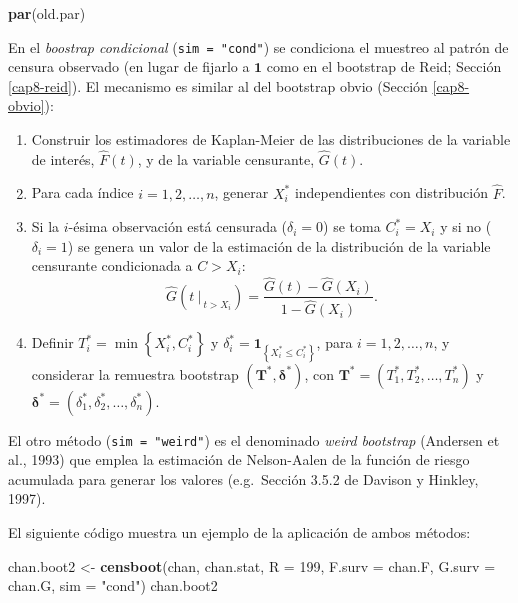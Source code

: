 \documentclass[
]{book}
\newenvironment{Shaded}{\begin{snugshade}}{\end{snugshade}}
\newcommand{\DataTypeTok}[1]{\textcolor[rgb]{0.13,0.29,0.53}{#1}}
\newcommand{\DecValTok}[1]{\textcolor[rgb]{0.00,0.00,0.81}{#1}}
\newcommand{\KeywordTok}[1]{\textcolor[rgb]{0.13,0.29,0.53}{\textbf{#1}}}
\newcommand{\NormalTok}[1]{#1}
\newcommand{\StringTok}[1]{\textcolor[rgb]{0.31,0.60,0.02}{#1}}
\theoremstyle{definition}
\theoremstyle{definition}
\theoremstyle{definition}
\theoremstyle{remark}
\begin{document}
\begin{Shaded}
\begin{Highlighting}[]
\KeywordTok{par}\NormalTok{(old.par)}
\end{Highlighting}
\end{Shaded}

En el \emph{boostrap condicional} (\texttt{sim\ =\ "cond"}) se condiciona el muestreo al
patrón de censura observado (en lugar de fijarlo a \(\mathbf{1}\) como en el bootstrap de Reid; Sección \ref{cap8-reid}).
El mecanismo es similar al del bootstrap obvio (Sección \ref{cap8-obvio}):

\begin{enumerate}
\def\labelenumi{\arabic{enumi}.}
\item
  Construir los estimadores de Kaplan-Meier de las distribuciones de
  la variable de interés, \(\hat{F}\left( t \right)\), y de la variable
  censurante, \(\hat{G}\left( t \right)\).
\item
  Para cada índice \(i=1,2,\ldots ,n\), generar \(X_i^{\ast}\) independientes
  con distribución \(\hat{F}\).
\item
  Si la \(i\)-ésima observación está censurada (\(\delta_i=0\)) se toma
  \(C_i^{\ast}=X_i\) y si no (\(\delta_i=1\)) se genera un valor de la estimación
  de la distribución de la variable censurante condicionada a \(C > X_i\):
  \[\hat G \left(\left. t \ \right\vert_{\ t > X_i} \right) 
  = \frac{\hat G(t) - \hat G(X_i)}{1- \hat G(X_i)}.\]
\item
  Definir \(T_i^{\ast}=\min \left\{ X_i^{\ast},C_i^{\ast}\right\}\) y
  \(\delta_i^{\ast}=\mathbf{1}_{\left\{ X_i^{\ast}\leq C_i^{\ast}\right\}}\), para \(i = 1, 2, \ldots, n\),
  y considerar la remuestra bootstrap
  \(\left( \mathbf{T}^{\ast},\boldsymbol{\delta}^{\ast}\right)\), con
  \(\mathbf{T}^{\ast}=\left( T_1^{\ast},T_2^{\ast}, \ldots, T_n^{\ast} \right)\) y \(\boldsymbol{\delta}^{\ast} = \left( \delta_1^{\ast}, \delta_2^{\ast},\ldots ,\delta_n^{\ast} \right)\).
\end{enumerate}

El otro método (\texttt{sim\ =\ "weird"}) es el denominado \emph{weird bootstrap}
(Andersen et al., 1993) que emplea la estimación de Nelson-Aalen de la
función de riesgo acumulada para generar los valores
(e.g.~Sección 3.5.2 de Davison y Hinkley, 1997).

El siguiente código muestra un ejemplo de la aplicación de ambos métodos:

\begin{Shaded}
\begin{Highlighting}[]
\NormalTok{chan.boot2 <-}\StringTok{ }\KeywordTok{censboot}\NormalTok{(chan, chan.stat, }\DataTypeTok{R =} \DecValTok{199}\NormalTok{, }\DataTypeTok{F.surv =}\NormalTok{ chan.F, }
                  \DataTypeTok{G.surv =}\NormalTok{ chan.G, }\DataTypeTok{sim =} \StringTok{"cond"}\NormalTok{)}
\NormalTok{chan.boot2}
\end{Highlighting}
\end{Shaded}
\end{document}
